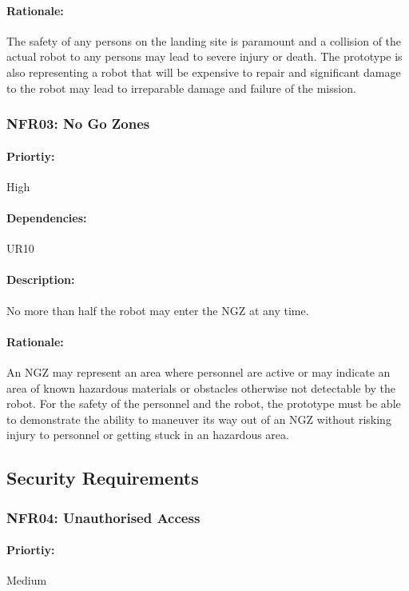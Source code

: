 \documentclass[10pt,a4paper,titlepage]{article}
\begin{document}
	\paragraph {Rationale:}The safety of any persons on the landing site is paramount and a collision of the actual robot to any persons may lead to severe injury or death. The prototype is also representing a robot that will be expensive to repair and significant damage to the robot may lead to irreparable damage and failure of the mission.
	
	\subsubsection*{NFR03: No Go Zones}
	\paragraph{Priortiy:} High
	\paragraph{Dependencies:} UR10
	\paragraph {Description:} No more than half the robot may enter the NGZ at any time.\\
	\paragraph{Rationale:} An NGZ may represent an area where personnel are active or may indicate an area of known hazardous materials or obstacles otherwise not detectable by the robot. For the safety of the personnel and the robot, the prototype must be able to demonstrate the ability to maneuver its way out of an NGZ without risking injury to personnel or getting stuck in an hazardous area.\\
	
	\subsection{Security Requirements}
	\subsubsection*{NFR04: Unauthorised Access}
	\paragraph{Priortiy:}Medium
\end{document}
